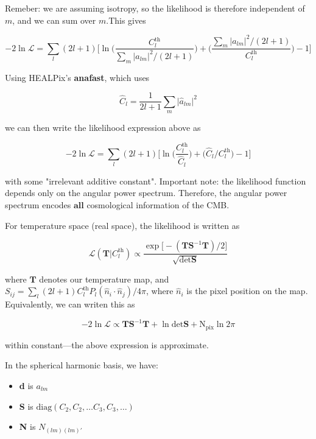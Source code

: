 \documentclass[a4paper, 11pt]{article}
\begin{document}
Remeber: we are assuming isotropy, so the likelihood is therefore independent of $m$, and we can sum over $m$.This gives 

\begin{equation}
-2\ln\mathcal{L} = \sum_{l}(2l+1)\Big[\ln\Big(\frac{C^{\text{th}}_l}{\sum_{m}\vert a_{lm}\vert^2/(2l+1)}\Big)+\Big(\frac{\sum_{m}\vert a_{lm}\vert^2/(2l+1)}{C^{\text{th}}_l}\Big)-1 \Big]
\end{equation}

Using HEALPix's \textbf{anafast}, which uses 

\begin{equation}
\hat{C}_l=\frac{1}{2l+1}\sum_m \vert\hat{a}_{lm}\vert^2
\end{equation}

we can then write the likelihood expression above as 

\begin{equation}
-2\ln\mathcal{L} = \sum_{l}(2l+1)\Big[\ln\Big( \frac{C^{\text{th}}_l}{\hat{C}_l}\Big) +\Big(\hat{C}_l/C^{\text{th}}_l\Big)-1 \Big]
\end{equation}

with some "irrelevant additive constant". Important note: the likelihood function depends only on the angular power spectrum. Therefore, the angular power spectrum encodes $\textbf{all}$ cosmological information of the CMB.

For temperature space (real space), the likelihood is written as 

\begin{equation}
\mathcal{L}(\textbf{T}\vert C^{\text{th}}_l)\propto \frac{\exp\big[-(\textbf{T}\textbf{S}^{-1}\textbf{T})/2\big]}{\sqrt{\text{det}\textbf{S}}}
\end{equation}

where $\textbf{T}$ denotes our temperature map, and $S_{ij}=\sum_l(2l+1)C^{\text{th}}_l P_l(\hat{n}_i\cdot\hat{n}_j)/4\pi$, where $\hat{n}_i$ is the pixel position on the map. Equivalently, we can writen this as

\begin{equation}
-2 \ln\mathcal{L}\propto\textbf{T}\textbf{S}^{-1}\textbf{T}+\ln\text{det}\textbf{S}+\text{N}_\text{pix}\ln2\pi
\end{equation}

within constant---the above expression is approximate. 

In the spherical harmonic basis, we have: 
\begin{itemize}
\item[]\textbf{d} is $a_{lm}$
\item[]\textbf{S} is $\text{diag}(C_2, C_2,\dots C_3, C_3, \dots)$
\item[]\textbf{N} is $N_{(lm)(lm)'}$
\end{itemize}
\end{document}
